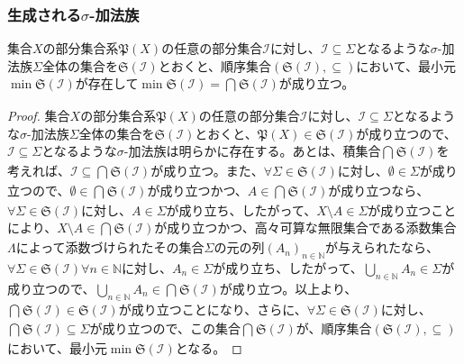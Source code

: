 \documentclass[dvipdfmx]{jsarticle}
\begin{document}
\subsubsection{生成される$\sigma$-加法族}%
\begin{thm}\label{4.5.2.5}
集合$X$の部分集合系$\mathfrak{P}(X)$の任意の部分集合$\mathcal{I}$に対し、$\mathcal{I \subseteq}\varSigma$となるような$\sigma$-加法族$\varSigma$全体の集合を$\mathfrak{S}\left( \mathcal{I} \right)$とおくと、順序集合$\left( \mathfrak{S}\left( \mathcal{I} \right), \subseteq \right)$において、最小元$\min{\mathfrak{S}\left( \mathcal{I} \right)}$が存在して$\min{\mathfrak{S}\left( \mathcal{I} \right)} = \bigcap_{} {\mathfrak{S}\left( \mathcal{I} \right)}$が成り立つ。
\end{thm}
\begin{proof}
集合$X$の部分集合系$\mathfrak{P}(X)$の任意の部分集合$\mathcal{I}$に対し、$\mathcal{I \subseteq}\varSigma$となるような$\sigma$-加法族$\varSigma$全体の集合を$\mathfrak{S}\left( \mathcal{I} \right)$とおくと、$\mathfrak{P}(X)\in \mathfrak{S}\left( \mathcal{I} \right)$が成り立つので、$\mathcal{I \subseteq}\varSigma$となるような$\sigma$-加法族は明らかに存在する。あとは、積集合$\bigcap_{} {\mathfrak{S}\left( \mathcal{I} \right)}$を考えれば、$\mathcal{I \subseteq}\bigcap_{} {\mathfrak{S}\left( \mathcal{I} \right)}$が成り立つ。また、$\forall\varSigma \in \mathfrak{S}\left( \mathcal{I} \right)$に対し、$\emptyset \in \varSigma$が成り立つので、$\emptyset \in \bigcap_{} {\mathfrak{S}\left( \mathcal{I} \right)}$が成り立つかつ、$A \in \bigcap_{} {\mathfrak{S}\left( \mathcal{I} \right)}$が成り立つなら、$\forall\varSigma \in \mathfrak{S}\left( \mathcal{I} \right)$に対し、$A \in \varSigma$が成り立ち、したがって、$X \setminus A \in \varSigma$が成り立つことにより、$X \setminus A \in \bigcap_{} {\mathfrak{S}\left( \mathcal{I} \right)}$が成り立つかつ、高々可算な無限集合である添数集合$\varLambda$によって添数づけられたその集合$\varSigma$の元の列$\left( A_{n} \right)_{n \in \mathbb{N}}$が与えられたなら、$\forall\varSigma \in \mathfrak{S}\left( \mathcal{I} \right)\forall n \in \mathbb{N}$に対し、$A_{n} \in \varSigma$が成り立ち、したがって、$\bigcup_{n \in \mathbb{N}} A_{n} \in \varSigma$が成り立つので、$\bigcup_{n \in \mathbb{N}} A_{n} \in \bigcap_{} {\mathfrak{S}\left( \mathcal{I} \right)}$が成り立つ。以上より、$\bigcap_{} {\mathfrak{S}\left( \mathcal{I} \right)}\in \mathfrak{S}\left( \mathcal{I} \right)$が成り立つことになり、さらに、$\forall\varSigma \in \mathfrak{S}\left( \mathcal{I} \right)$に対し、$\bigcap_{} {\mathfrak{S}\left( \mathcal{I} \right)} \subseteq \varSigma$が成り立つので、この集合$\bigcap_{} {\mathfrak{S}\left( \mathcal{I} \right)}$が、順序集合$\left( \mathfrak{S}\left( \mathcal{I} \right), \subseteq \right)$において、最小元$\min{\mathfrak{S}\left( \mathcal{I} \right)}$となる。
\end{proof}
\end{document}
